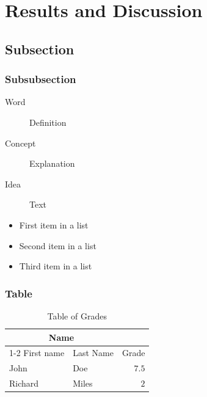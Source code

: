 \documentclass[
12pt, %
a4paper, %
oneside, %
headinclude,footinclude, %
BCOR5mm, %
]{scrartcl}
\begin{document}

\section{Results and Discussion}

\lipsum[10] %


\subsection{Subsection}

\lipsum[11] %

\subsubsection{Subsubsection}

\lipsum[12] %

\begin{description}
\item[Word] Definition
\item[Concept] Explanation
\item[Idea] Text
\end{description}

\lipsum[12] %

\begin{itemize}[noitemsep] %
\item First item in a list
\item Second item in a list
\item Third item in a list
\end{itemize}

\subsubsection{Table}

\lipsum[13] %

\begin{table}[hbt]
\caption{Table of Grades}
\centering
\begin{tabular}{llr}
\toprule
\multicolumn{2}{c}{Name} \\
\cmidrule(r){1-2}
First name & Last Name & Grade \\
\midrule
John & Doe & $7.5$ \\
Richard & Miles & $2$ \\
\bottomrule
\end{tabular}
\label{tab:label}
\end{table}
\end{document}

